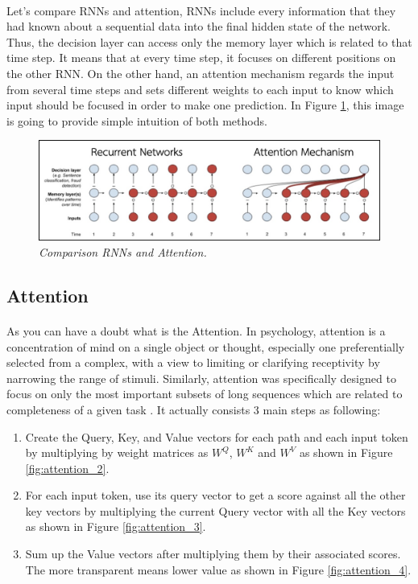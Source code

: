 \paragraph{}
Let’s compare RNNs and attention, RNNs include every information that they had known about a sequential data into the final hidden state of the network. Thus, the decision layer can access only the memory layer which is related to that time step. It means that at every time step, it focuses on different positions on the other RNN. On the other hand, an attention mechanism regards the input from several time steps and sets different weights to each input to know which input should be focused in order to make one prediction. In Figure \ref{fig:rnnvsattention}, this image is going to provide simple intuition of both methods.

\begin{figure}[H]
  \centering
  \caption[Comparison RNNs and Attention.]{\emph{Comparison RNNs and Attention.}}\label{fig:rnnvsattention}
  \includegraphics[scale = 0.4
  ]{figures/rnnvsattention.jpg}  
\end{figure}
\subsection{Attention}
\paragraph{}
As you can have a doubt what is the Attention. In psychology, attention is  a concentration of mind on a single object or thought, especially one preferentially selected from a complex, with a view to limiting or clarifying receptivity by narrowing the range of stimuli. Similarly, attention was specifically designed to focus on only the most important subsets of long sequences which are related to completeness of a given task \cite{alammar_2018,alammar_2019,klingenbrunn_2021}. It actually consists 3 main steps as following:
\begin{enumerate}
\item Create the Query, Key, and Value vectors for each path and each input token by multiplying by weight matrices as $W^Q$, $W^K$ and $W^V$ as shown in Figure \ref{fig:attention_2}.
\item For each input token, use its query vector to get a score against all the other key vectors by multiplying the current Query vector with all the Key vectors as shown in Figure \ref{fig:attention_3}.
\item Sum up the Value vectors after multiplying them by their associated scores. The more transparent means lower value as shown in Figure \ref{fig:attention_4}.
\end{enumerate}

